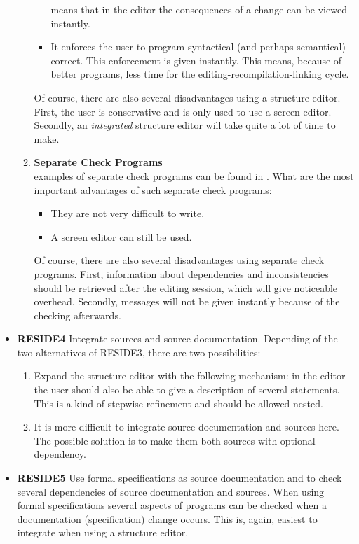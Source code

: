 \begin{itemize}
\begin{enumerate}
\begin{itemize}
               means that in the editor the consequences of a change can be 
               viewed instantly. 
         \item It enforces the user to program syntactical (and perhaps 
               semantical) correct. This enforcement is given instantly. This 
               means, because of better programs, less time for the 
               editing-recompilation-linking cycle.
       \end{itemize}
           Of course, there are also several disadvantages using a structure 
           editor. First, the user is conservative and is only used to use a 
           screen editor. Secondly, an {\em integrated}\/ structure editor will 
           take quite a lot of time to make.
     \item {\bf Separate Check Programs}\\
           examples of separate check programs can be found in \cite{acm:proc}.
           What are the most important advantages of such separate check 
           programs:
       \begin{itemize}
         \item They are not very difficult to write.
         \item A screen editor can still be used.
       \end{itemize}
           Of course, there are also several disadvantages using separate check
           programs. First, information about dependencies and inconsistencies 
           should be retrieved 
           after the editing session, which will give noticeable overhead. 
           Secondly, messages will not be given instantly because of the 
           checking afterwards.
   \end{enumerate}
  \item {\bf RESIDE4} Integrate sources and source documentation. Depending of 
        the two alternatives of RESIDE3, there are two possibilities: 
     \begin{enumerate}
       \item Expand the structure editor with the following mechanism: in the 
             editor the user should also be able to give a description of 
             several statements. This is a kind of stepwise refinement and 
             should be allowed nested.
       \item It is more difficult to integrate source documentation and sources 
             here. The possible solution is to make them both sources with 
             optional dependency.
     \end{enumerate}
  \item {\bf RESIDE5} Use formal specifications as source documentation and to 
         check several dependencies of source documentation and sources. When 
         using formal specifications several aspects of programs can be checked 
         when a documentation (specification) change occurs. This is, again, 
         easiest to integrate when using a structure editor.
\end{itemize}

